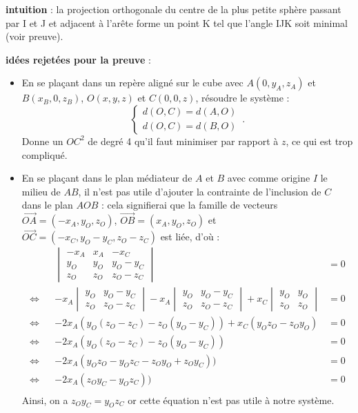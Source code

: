 \documentclass{article}
\begin{document}
\textbf{intuition} : la projection orthogonale du centre de la plus petite sphère passant par I et J et adjacent à l'arête forme un point K tel que l'angle IJK soit minimal (voir preuve).

\textbf{idées rejetées pour la preuve } :
\begin{itemize}
    \item En se plaçant dans un repère aligné sur le cube avec $A(0, y_A, z_A)$ et $B(x_B, 0, z_B)$, $O(x, y, z)$ et $C(0, 0, z)$, résoudre le système :
\begin{equation}
    \begin{cases}
      d(O, C) = d(A, O)\\
      d(O, C) = d(B, O)
    \end{cases}\,.
\end{equation}
Donne un $OC^2$ de degré 4 qu'il faut minimiser par rapport à $z$, ce qui est trop compliqué.
    \item En se plaçant dans le plan médiateur de $A$ et $B$ avec comme origine $I$ le milieu de $AB$, il n'est pas utile d'ajouter la contrainte de l'inclusion de $C$ dans le plan $AOB$ : cela signifierai que la famille de vecteurs $\overrightarrow{OA} = (-x_A, y_O, z_O)$, $\overrightarrow{OB} = (x_A, y_O, z_O)$ et $\overrightarrow{OC} = (- x_C, y_O - y_C, z_O - z_C)$ est liée, d'où :
    \begin{align*}
        &&                 \begin{vmatrix}
                          -x_A & x_A & -x_C\\
                           y_O  & y_O & y_O - y_C\\
                           z_O  & z_O & z_O - z_C
                           \end{vmatrix} &= 0\\
        \Leftrightarrow && -x_A \begin{vmatrix}y_O & y_O - y_C\\z_O & z_O - z_C\end{vmatrix} - x_A \begin{vmatrix}y_O & y_O - y_C\\z_O & z_O - z_C\end{vmatrix} + x_C \begin{vmatrix}y_O & y_O\\z_O & z_O\end{vmatrix} &= 0\\
        \Leftrightarrow && -2x_A(y_O(z_O - z_C) - z_O(y_O - y_C)) + x_C(y_Oz_O - z_Oy_O) &= 0\\
        \Leftrightarrow && -2x_A(y_O(z_O - z_C) - z_O(y_O - y_C)) &= 0\\
        \Leftrightarrow && -2x_A(y_Oz_O - y_Oz_C - z_Oy_O + z_Oy_C)) &= 0\\
        \Leftrightarrow && -2x_A(z_Oy_C - y_Oz_C)) &= 0\\
    \end{align*}
    Ainsi, on a $\boxed{z_Oy_C = y_Oz_C}$ or cette équation n'est pas utile à notre système.


\end{itemize}
\end{document}
